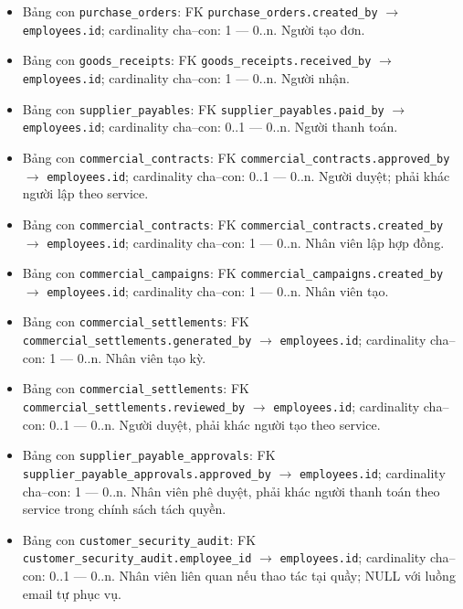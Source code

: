 \begin{itemize}
\item Bảng con \texttt{purchase\_orders}: FK \texttt{purchase\_orders.created\_by} $\rightarrow$ \texttt{employees.id}; cardinality cha--con: 1 — 0..n. Người tạo đơn.

\item Bảng con \texttt{goods\_receipts}: FK \texttt{goods\_receipts.received\_by} $\rightarrow$ \texttt{employees.id}; cardinality cha--con: 1 — 0..n. Người nhận.

\item Bảng con \texttt{supplier\_payables}: FK \texttt{supplier\_payables.paid\_by} $\rightarrow$ \texttt{employees.id}; cardinality cha--con: 0..1 — 0..n. Người thanh toán.

\item Bảng con \texttt{commercial\_contracts}: FK \texttt{commercial\_contracts.approved\_by} $\rightarrow$ \texttt{employees.id}; cardinality cha--con: 0..1 — 0..n. Người duyệt; phải khác người lập theo service.

\item Bảng con \texttt{commercial\_contracts}: FK \texttt{commercial\_contracts.created\_by} $\rightarrow$ \texttt{employees.id}; cardinality cha--con: 1 — 0..n. Nhân viên lập hợp đồng.

\item Bảng con \texttt{commercial\_campaigns}: FK \texttt{commercial\_campaigns.created\_by} $\rightarrow$ \texttt{employees.id}; cardinality cha--con: 1 — 0..n. Nhân viên tạo.

\item Bảng con \texttt{commercial\_settlements}: FK \texttt{commercial\_settlements.generated\_by} $\rightarrow$ \texttt{employees.id}; cardinality cha--con: 1 — 0..n. Nhân viên tạo kỳ.

\item Bảng con \texttt{commercial\_settlements}: FK \texttt{commercial\_settlements.reviewed\_by} $\rightarrow$ \texttt{employees.id}; cardinality cha--con: 0..1 — 0..n. Người duyệt, phải khác người tạo theo service.

\item Bảng con \texttt{supplier\_payable\_approvals}: FK \texttt{supplier\_payable\_approvals.approved\_by} $\rightarrow$ \texttt{employees.id}; cardinality cha--con: 1 — 0..n. Nhân viên phê duyệt, phải khác người thanh toán theo service trong chính sách tách quyền.

\item Bảng con \texttt{customer\_security\_audit}: FK \texttt{customer\_security\_audit.employee\_id} $\rightarrow$ \texttt{employees.id}; cardinality cha--con: 0..1 — 0..n. Nhân viên liên quan nếu thao tác tại quầy; NULL với luồng email tự phục vụ.

\end{itemize}

